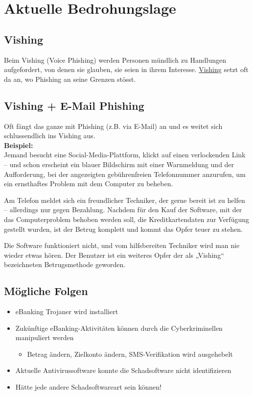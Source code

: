 
\section{Aktuelle Bedrohungslage}

\subsection{Vishing}
Beim Vishing (Voice Phishing) werden Personen mündlich zu Handlungen aufgefordert, von denen sie glauben, sie seien in ihrem Interesse. \href{https://www.kaspersky.de/resource-center/definitions/vishing}{Vishing} setzt oft da an, wo Phishing an seine Grenzen stösst.

\subsection{Vishing + E-Mail Phishing}

Oft fängt das ganze mit Phishing (z.B. via E-Mail) an und es weitet sich schlussendlich ins Vishing aus.\\

\textbf{Beispiel:}\\
Jemand besucht eine Social-Media-Plattform, klickt auf einen verlockenden Link – und schon erscheint ein blauer Bildschirm mit einer Warnmeldung und der Aufforderung, bei der angezeigten gebührenfreien Telefonnummer anzurufen, um ein ernsthaftes Problem mit dem Computer zu beheben.

Am Telefon meldet sich ein freundlicher Techniker, der gerne bereit ist zu helfen – allerdings nur gegen Bezahlung. Nachdem für den Kauf der Software, mit der das Computerproblem behoben werden soll, die Kreditkartendaten zur Verfügung gestellt wurden, ist der Betrug komplett und kommt das Opfer teuer zu stehen.

Die Software funktioniert nicht, und vom hilfsbereiten Techniker wird man nie wieder etwas hören. Der Benutzer ist ein weiteres Opfer der als „Vishing“ bezeichneten Betrugsmethode geworden.

\subsection{Mögliche Folgen}
\begin{itemize}
    \item eBanking Trojaner wird installiert
    \item Zukünftige eBanking-Aktivitäten können durch die Cyberkriminellen manipuliert werden
    \begin{itemize}
        \item Betrag ändern, Zielkonto ändern, SMS-Verifikation wird ausgehebelt
    \end{itemize}
    \item Aktuelle Antivirussoftware konnte die Schadsoftware nicht identifizieren
    \item Hätte jede andere Schadsoftwareart sein können!
\end{itemize}

